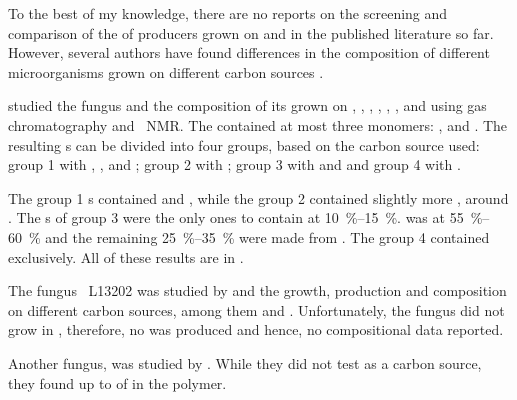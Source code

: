 To the best of my knowledge, there are no reports on the screening and comparison of the \eps{} \amc{} of \eps{} producers grown on \glc{} and \xyl{} in the published literature so far. However, several authors have found differences in the \eps{} composition of different microorganisms grown on different carbon sources \cite{Kai2003, Lee1995, Lee2007, Grobben1996, Grobben1997, Cerning1994, Fischer2003, Osman1986, Bryan1986, Raza2011, Tait1986}.

\textcite{Kai2003} studied the fungus  and the composition of its \eps{} grown on \glc{}, \man{}, \gal{}, \xyl{}, \glcnac{}, \rha{}, \lara{} and \dara{} using gas chromatography and ~NMR. The \eps{} contained at most three monomers: \man{}, \glc{} and \gal{}. The resulting \eps{}s can be divided into four groups, based on the carbon source used: group 1 with \glc{}, \man{}, \rha{} and \dara{}; group 2 with \gal{}; group 3 with \xyl{} and \glcnac{} and group 4 with \lara{}.

The group 1 \eps{}s contained  \glc{} and  \man{}, while the group 2 \eps{} contained slightly more \man{}, around . The \eps{}s of group 3 were the only ones to contain \gal{} at \SIrange{10}{15}{\percent}. \GLC{} was at \SIrange{55}{60}{\percent} and the remaining \SIrange{25}{35}{\percent} were made from \man{}. The group 4 \eps{} contained \glc{} exclusively. All of these results are in \si{\molpercent}.

The fungus ~L13202 was studied by \textcite{Lee1995} and the growth, \eps{} production and composition on different carbon sources, among them \glc{} and \xyl{}. Unfortunately, the fungus did not grow in \xyl{}, therefore, no \eps{} was produced and hence, no compositional data reported.

Another fungus,  was studied by \textcite{Lee2007}. While they did not test \xyl{} as a carbon source, they found up to  of \xyl{} in the polymer.

